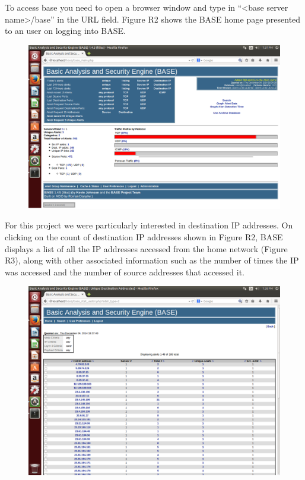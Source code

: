 To access base you need to open a browser window and type in “<base server
name>/base” in the URL field.
%
Figure R2 shows the BASE home page presented to an user on logging into BASE.

\begin{figure}
\includegraphics{figures/R2_BASE_Main}
\end{figure}

For this project we were particularly interested in destination IP
addresses. 
%
On clicking on the count of destination IP addresses shown
in Figure R2, BASE displays a list of all the IP addresses accessed
from the home network (Figure R3), along with other associated
information such as the number of times the IP was accessed and the
number of source addresses that accessed it.

\begin{figure}
\includegraphics{figures/R3_BASE_IPList}
\end{figure}

